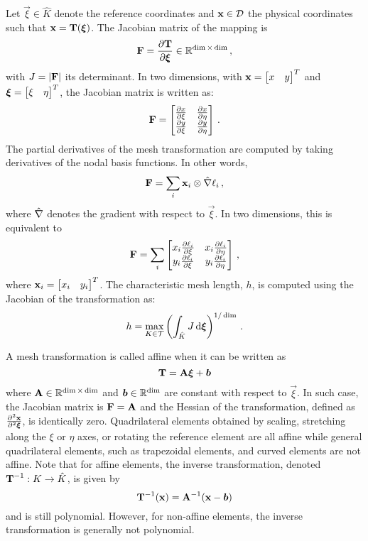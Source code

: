 \documentclass[../doc.tex]{subfiles}
\begin{document}
Let $\vec{\xi} \in \hat{K}$ denote the reference coordinates and $\boldsymbol{\mathrm{x}} \in \mathcal{D}$ the physical coordinates such that $\boldsymbol{\mathrm{x}} = \boldsymbol{\mathrm{T}}(\boldsymbol{\xi})$. The Jacobian matrix of the mapping is 
	\begin{equation}
		\boldsymbol{\mathrm{F}} = \frac{\partial \boldsymbol{\mathrm{T}}}{\partial \boldsymbol{\xi}} \in \mathbb{R}^{\dim\times\dim} \,, 
	\end{equation}
with $J = |\boldsymbol{\mathrm{F}}|$ its determinant. 
In two dimensions, with $\boldsymbol{\mathrm{x}} = \begin{bmatrix} x & y \end{bmatrix}^T$ and $\boldsymbol{\xi} = \begin{bmatrix} \xi & \eta \end{bmatrix}^T$, the Jacobian matrix is written as: 
	\begin{equation}
		\boldsymbol{\mathrm{F}} = \begin{bmatrix} 
			\frac{\partial x}{\partial \xi} & \frac{\partial x}{\partial \eta} \\ 
			\frac{\partial y}{\partial \xi} & \frac{\partial y}{\partial \eta} 
		\end{bmatrix} \,.
	\end{equation}
The partial derivatives of the mesh transformation are computed by taking derivatives of the nodal basis functions. In other words, 
	\begin{equation}
		\boldsymbol{\mathrm{F}} = \sum_i \boldsymbol{\mathrm{x}}_{i} \otimes \hat{\nabla} \ell_i \,,
	\end{equation}
where $\hat{\nabla}$ denotes the gradient with respect to $\vec{\xi}$. In two dimensions, this is equivalent to 
	\begin{equation}
		\boldsymbol{\mathrm{F}} = \sum_{i} \begin{bmatrix} 
			x_{i} \frac{\partial \ell_i}{\partial \xi} & x_{i} \frac{\partial \ell_i}{\partial \eta} \\
			y_{i} \frac{\partial \ell_i}{\partial \xi} & y_{i} \frac{\partial \ell_i}{\partial \eta} 
		\end{bmatrix} \,, 
	\end{equation}
where $\boldsymbol{\mathrm{x}}_{i} = \begin{bmatrix} x_{i} & y_{i} \end{bmatrix}^T$. 
The characteristic mesh length, $h$, is computed using the Jacobian of the transformation as: 
	\begin{equation}
		h = \max_{K\in\mathcal{T}} \left( \int_{\hat{K}} J \mathop{}\!\mathrm{d}\boldsymbol{\xi} \right)^{1/\dim} \,.
	\end{equation}

A mesh transformation is called affine when it can be written as
	\begin{equation}
		\boldsymbol{\mathrm{T}} = \boldsymbol{\mathrm{A}}\boldsymbol{\xi} + \boldsymbol{b}
	\end{equation}
where $\boldsymbol{\mathrm{A}}\in\mathbb{R}^{\dim\times\dim}$ and $\boldsymbol{b}\in\mathbb{R}^{\dim}$ are constant with respect to $\vec{\xi}$. In such case, the Jacobian matrix is $\boldsymbol{\mathrm{F}} = \boldsymbol{\mathrm{A}}$ and the Hessian of the transformation, defined as $\frac{\partial^2 \boldsymbol{\mathrm{x}}}{\partial^2 \boldsymbol{\xi}}$, is identically zero. Quadrilateral elements obtained by scaling, stretching along the $\xi$ or $\eta$ axes, or rotating the reference element are all affine while general quadrilateral elements, such as trapezoidal elements, and curved elements are not affine. Note that for affine elements, the inverse transformation, denoted $\boldsymbol{\mathrm{T}}^{-1} : K \rightarrow \hat{K}$, is given by  
	\begin{equation}
		\boldsymbol{\mathrm{T}}^{-1}(\boldsymbol{\mathrm{x}}) = \boldsymbol{\mathrm{A}}^{-1}(\boldsymbol{\mathrm{x}} - \boldsymbol{b})
	\end{equation}
and is still polynomial. However, for non-affine elements, the inverse transformation is generally not polynomial. 
\end{document}
